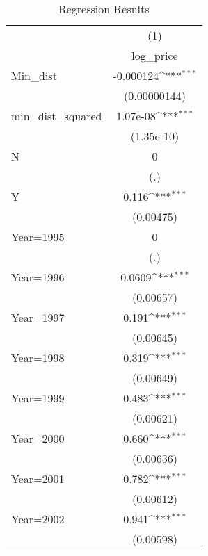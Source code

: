 {
\def\sym#1{\ifmmode^{#1}\else\(^{#1}\)\fi}
\begin{longtable}{l*{1}{c}}
\caption{Regression Results}\\
\toprule\endfirsthead\midrule\endhead\midrule\endfoot\endlastfoot
                    &\multicolumn{1}{c}{(1)}\\
                    &\multicolumn{1}{c}{log\_price}\\
\midrule
Min\_dist            &   -0.000124\sym{***}\\
                    &(0.00000144)         \\
\addlinespace
min\_dist\_squared    &    1.07e-08\sym{***}\\
                    &  (1.35e-10)         \\
\addlinespace
N                   &           0         \\
                    &         (.)         \\
\addlinespace
Y                   &       0.116\sym{***}\\
                    &   (0.00475)         \\
\addlinespace
Year=1995           &           0         \\
                    &         (.)         \\
\addlinespace
Year=1996           &      0.0609\sym{***}\\
                    &   (0.00657)         \\
\addlinespace
Year=1997           &       0.191\sym{***}\\
                    &   (0.00645)         \\
\addlinespace
Year=1998           &       0.319\sym{***}\\
                    &   (0.00649)         \\
\addlinespace
Year=1999           &       0.483\sym{***}\\
                    &   (0.00621)         \\
\addlinespace
Year=2000           &       0.660\sym{***}\\
                    &   (0.00636)         \\
\addlinespace
Year=2001           &       0.782\sym{***}\\
                    &   (0.00612)         \\
\addlinespace
Year=2002           &       0.941\sym{***}\\
                    &   (0.00598)         \\

\end{longtable}}
